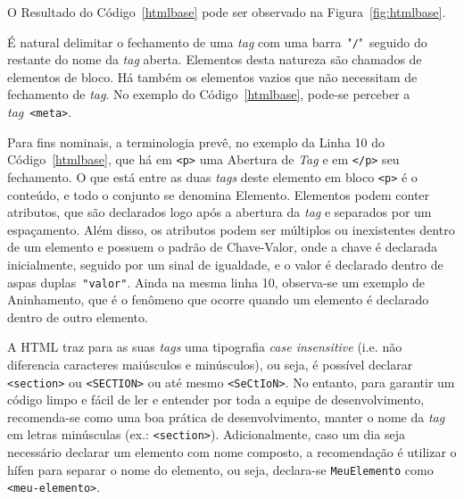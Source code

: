 O Resultado do Código~\ref{htmlbase} pode ser observado na Figura~\ref{fig:htmlbase}.

\begin{figure}[th]
\end{figure}

É natural delimitar o fechamento de uma \textit{tag} com uma barra~"\texttt{/}"~seguido do restante do nome da \textit{tag} aberta. Elementos desta natureza são chamados de elementos de bloco. Há também os elementos vazios que não necessitam de fechamento de \textit{tag}. No exemplo do Código~\ref{htmlbase}, pode-se perceber a \textit{tag}~\texttt{<meta>}.

Para fins nominais, a terminologia prevê, no exemplo da Linha 10 do Código~\ref{htmlbase}, que há em \texttt{<p>} uma Abertura de \textit{Tag} e em \texttt{</p>} seu fechamento. O que está entre as duas \textit{tags} deste elemento em bloco \texttt{<p>} é o conteúdo, e todo o conjunto se denomina Elemento. Elementos podem conter atributos, que são declarados logo após a abertura da \textit{tag} e separados por um espaçamento. Além disso, os atributos podem ser múltiplos ou inexistentes dentro de um elemento e possuem o padrão de Chave-Valor, onde a chave é declarada inicialmente, seguido por um sinal de igualdade, e o valor é declarado dentro de aspas duplas~\texttt{"valor"}. Ainda na mesma linha 10, observa-se um exemplo de Aninhamento, que é o fenômeno que ocorre quando um elemento é declarado dentro de outro elemento.

A HTML traz para as suas \textit{tags} uma tipografia \textit{case insensitive} (i.e. não diferencia caracteres maiúsculos e minúsculos), ou seja, é possível declarar \texttt{<section>} ou \texttt{<SECTION>} ou até mesmo \texttt{<SeCtIoN>}. No entanto, para garantir um código limpo e fácil de ler e entender por toda a equipe de desenvolvimento, recomenda-se como uma boa prática de desenvolvimento, manter o nome da \textit{tag} em letras minúsculas (ex.: \texttt{<section>}). Adicionalmente, caso um dia seja necessário declarar um elemento com nome composto, a recomendação é utilizar o hífen para separar o nome do elemento, ou seja, declara-se \texttt{MeuElemento} como \texttt{<meu-elemento>}.

